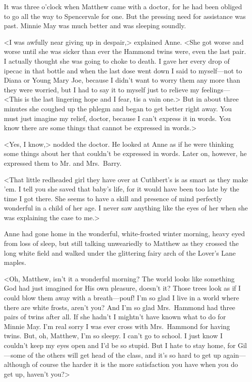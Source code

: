 It was three o'clock when Matthew came with a doctor, for he had been obliged to go all the way to Spencervale for one. But the pressing need for assistance was past. Minnie May was much better and was sleeping soundly.

<I was awfully near giving up in despair,> explained Anne. <She got worse and worse until she was sicker than ever the Hammond twins were, even the last pair. I actually thought she was going to choke to death. I gave her every drop of ipecac in that bottle and when the last dose went down I said to myself—not to Diana or Young Mary Joe, because I didn't want to worry them any more than they were worried, but I had to say it to myself just to relieve my feelings—<This is the last lingering hope and I fear, tis a vain one.> But in about three minutes she coughed up the phlegm and began to get better right away. You must just imagine my relief, doctor, because I can't express it in words. You know there are some things that cannot be expressed in words.>

<Yes, I know,> nodded the doctor. He looked at Anne as if he were thinking some things about her that couldn't be expressed in words. Later on, however, he expressed them to Mr. and Mrs.~Barry.

<That little redheaded girl they have over at Cuthbert's is as smart as they make 'em. I tell you she saved that baby's life, for it would have been too late by the time I got there. She seems to have a skill and presence of mind perfectly wonderful in a child of her age. I never saw anything like the eyes of her when she was explaining the case to me.>

Anne had gone home in the wonderful, white-frosted winter morning, heavy eyed from loss of sleep, but still talking unweariedly to Matthew as they crossed the long white field and walked under the glittering fairy arch of the Lover's Lane maples.

<Oh, Matthew, isn't it a wonderful morning? The world looks like something God had just imagined for His own pleasure, doesn't it? Those trees look as if I could blow them away with a breath—pouf! I'm so glad I live in a world where there are white frosts, aren't you? And I'm so glad Mrs.~Hammond had three pairs of twins after all. If she hadn't I mightn't have known what to do for Minnie May. I'm real sorry I was ever cross with Mrs.~Hammond for having twins. But, oh, Matthew, I'm so sleepy. I can't go to school. I just know I couldn't keep my eyes open and I'd be so stupid. But I hate to stay home, for Gil—some of the others will get head of the class, and it's so hard to get up again—although of course the harder it is the more satisfaction you have when you do get up, haven't you?>

